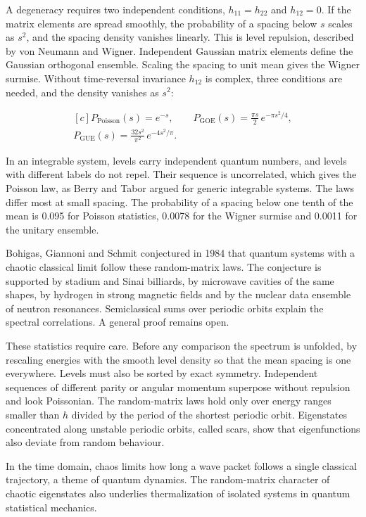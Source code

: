 \documentclass[11pt,oneside]{book}
\newenvironment{centeredalign}{\[\begin{gathered}[c]}{\end{gathered}\]}
\begin{document}
A degeneracy requires two independent conditions, \(h_{11}=h_{22}\) and \(h_{12}=0\). If the matrix elements are spread smoothly, the probability of a spacing below \(s\) scales as \(s^2\), and the spacing density vanishes linearly. This is level repulsion, described by von Neumann and Wigner. Independent Gaussian matrix elements define the Gaussian orthogonal ensemble. Scaling the spacing to unit mean gives the Wigner surmise. Without time-reversal invariance \(h_{12}\) is complex, three conditions are needed, and the density vanishes as \(s^2\):

\begin{centeredalign}
P_{\mathrm{Poisson}}(s)=e^{-s},\qquad
P_{\mathrm{GOE}}(s)=\frac{\pi s}{2}\,e^{-\pi s^2/4},\\
P_{\mathrm{GUE}}(s)=\frac{32s^2}{\pi^2}\,e^{-4s^2/\pi}.
\end{centeredalign}

In an integrable system, levels carry independent quantum numbers, and levels with different labels do not repel. Their sequence is uncorrelated, which gives the Poisson law, as Berry and Tabor argued for generic integrable systems. The laws differ most at small spacing. The probability of a spacing below one tenth of the mean is 0.095 for Poisson statistics, 0.0078 for the Wigner surmise and 0.0011 for the unitary ensemble.

Bohigas, Giannoni and Schmit conjectured in 1984 that quantum systems with a chaotic classical limit follow these random-matrix laws. The conjecture is supported by stadium and Sinai billiards, by microwave cavities of the same shapes, by hydrogen in strong magnetic fields and by the nuclear data ensemble of neutron resonances. Semiclassical sums over periodic orbits explain the spectral correlations. A general proof remains open.

These statistics require care. Before any comparison the spectrum is unfolded, by rescaling energies with the smooth level density so that the mean spacing is one everywhere. Levels must also be sorted by exact symmetry. Independent sequences of different parity or angular momentum superpose without repulsion and look Poissonian. The random-matrix laws hold only over energy ranges smaller than \(h\) divided by the period of the shortest periodic orbit. Eigenstates concentrated along unstable periodic orbits, called scars, show that eigenfunctions also deviate from random behaviour.

In the time domain, chaos limits how long a wave packet follows a single classical trajectory, a theme of quantum dynamics. The random-matrix character of chaotic eigenstates also underlies thermalization of isolated systems in quantum statistical mechanics.
\end{document}
